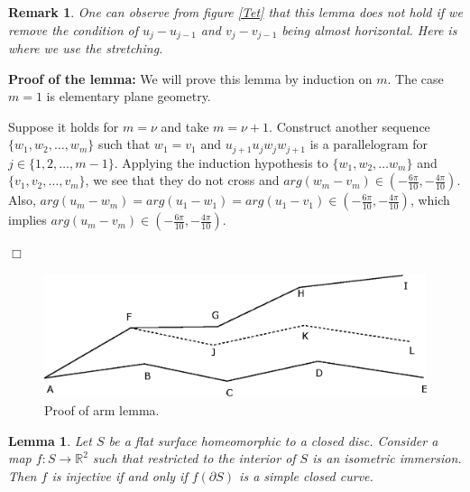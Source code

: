 \documentclass[openright, 12pt]{article}
\newtheorem{lema}[teorema]{Lemma}
\newtheorem{rem}[teorema]{Remark}
\begin{document}
\begin{rem}
{\rm One can observe from figure \ref{Tet} that this lemma does not hold if  we remove the condition of $u_{j }- u_{j-1}$ and $ v_j - v_{j-1} $ being almost horizontal. Here is where we use the stretching. 
}
\end{rem}




\textbf{Proof of the lemma: }We will prove this lemma by induction on $m$. The case $m=1$ is elementary plane geometry.


Suppose it holds for $m=\nu$ and take $m = \nu +1$. Construct another sequence $\{ w_1, w_2, \ldots, w_m   \}$ such that $w_1 = v_1$ and $u_{j+1}u_jw_jw_{j+1} $ is a parallelogram for $j \in \{ 1, 2, \ldots , m-1\} $. Applying the induction hypothesis to $\{ w_1, w_2, \ldots w_m   \}$ and $\{v_1, v_2, \ldots, v_m  \}$, we see that they do not cross and $arg( w_{m} - v_m) \in \left( - \frac{6 \pi}{10} , -\frac{4\pi}{10}  \right)$. Also, $arg(u_m - w_m )= arg (u_1 - w_1) = arg (u_1 - v_1) \in \left( - \frac{6 \pi}{10} , -\frac{4\pi}{10}  \right)$, which implies $arg(u_m - v_m)\in \left( - \frac{6 \pi}{10} , -\frac{4\pi}{10}  \right)$.

\hfill $\Box$


\begin{figure}[h]
\centering
{}
\includegraphics[scale=0.95]{arms.eps}
\caption{Proof of arm lemma.}
\end{figure}



\begin{lema}\label{Argument}
{\rm Let $S$ be a flat surface homeomorphic to a closed disc. Consider a map $f: S \rightarrow \mathbb{R}^2$ such that restricted to the interior of $S$ is an isometric immersion. Then $f$ is injective if and only if $f(\partial S)$ is a simple closed curve. 
}
\end{lema}
\end{document}
